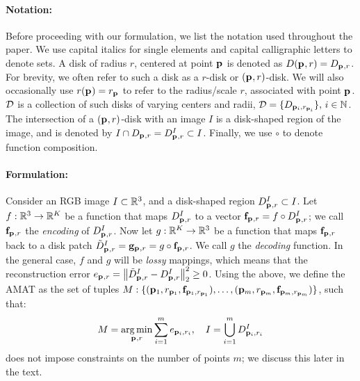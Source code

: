 \documentclass[10pt,twocolumn,letterpaper]{article}
\begin{document}
\paragraph{Notation:} Before proceeding with our formulation, we list the notation used throughout the paper.
We use capital italics for single elements and capital calligraphic letters to denote sets. A disk of radius $r$,
centered at point $\mathbf{p}_{}$ is denoted as $D(\mathbf{p}_{},r)=D_{\mathbf{p}_{},r}$. 
For brevity, we often refer to such a disk as a $r$-disk or $(\mathbf{p}_{},r)$-disk.
We will also occasionally use $r(\mathbf{p}_{}) = r_{\mathbf{p}_{}}$ to refer to the radius/scale $r$, associated with point $\mathbf{p}_{}$.
$\mathcal{D}$ is a collection of such disks of varying centers and radii, $\mathcal{D}=\{ D_{\mathbf{p}_{i},r_{\mathbf{p}_{i}}} \},\, i\in\mathbb{N}$.
The intersection of a $(\mathbf{p}_{},r)$-disk with an image $I$ is a disk-shaped region of the image, and is denoted by 
$I \cap D_{\mathbf{p}_{},r}=D_{\mathbf{p}_{},r}^I \subset I$. Finally, we use $\circ$ to denote function composition.

\paragraph{Formulation:} Consider an RGB image $I\subset\mathbb{R}^3$, and a disk-shaped region $D_{\mathbf{p}_{},r}^I \subset I$.
Let $f:\mathbb{R}^3 \rightarrow \mathbb{R}^K$ be a function that maps $D_{\mathbf{p}_{},r}^I$ to a vector  $\mathbf{f}_{\mathbf{p}_{},r}=f\circ D_{\mathbf{p}_{},r}^I$; 
we call $\mathbf{f}_{\mathbf{p}_{},r}$ the \emph{encoding} of $D_{\mathbf{p}_{},r}^I$. 
Now let $g:\mathbb{R}^K \rightarrow \mathbb{R}^3$ be a function that maps $\mathbf{f}_{\mathbf{p}_{},r}$ back to a disk patch 
$\tilde{D}_{\mathbf{p}_{},r}^I = \mathbf{g}_{\mathbf{p}_{},r} = g \circ \mathbf{f}_{\mathbf{p}_{},r}$. We call $g$ the \emph{decoding} function.
In the general case, $f$ and $g$ will be \emph{lossy} mappings, which means that the reconstruction error 
$e_{\mathbf{p}_{},r} = \left \lVert  \tilde{D}_{\mathbf{p}_{},r}^I - D_{\mathbf{p}_{},r}^I \right \rVert_2^2 \geq 0$. 
Using the above, we define the AMAT as the set of tuples 
$M:\{ ( \mathbf{p}_{1},r_{\mathbf{p}_{1}}, \mathbf{f}_{\mathbf{p}_{1},r_{\mathbf{p}_{1}}} ), \ldots, ( \mathbf{p}_{m},r_{\mathbf{p}_{m}}, \mathbf{f}_{\mathbf{p}_{m},r_{\mathbf{p}_{m}}} ) \}$, such that:
\begin{equation}
M = \operatorname*{arg\,min}_{\mathbf{p}_{},r}{\sum_{i=1}^m e_{\mathbf{p}_{i},r_i}},\quad I=\bigcup_{i=1}^m D_{\mathbf{p}_{i},r_i}^I 
\label{eq:minimization}
\end{equation}
 does not impose constraints on the number of points $m$;
we discuss this later in the text.
\end{document}
